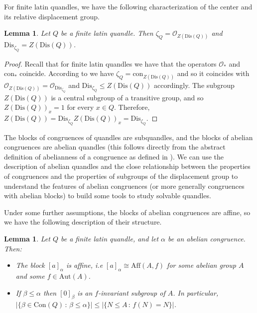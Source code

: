 \documentclass[a4paper, english, 9pt]{amsart}
\theoremstyle{plain}
\newtheorem{lemma}[theorem]{Lemma}
\theoremstyle{definition}
\def\aut#1{\mathrm{Aut}(#1)}
\def\aff#1{\mathrm{Aff}#1}
\def\dis{\mathrm{Dis}}
\def\con{\mathrm{Con}}
\def\c#1{\mathrm{con}_{#1}}
\def\setof#1#2{\{#1\,\colon\,#2\}}
\begin{document}
For finite latin quandles, we have the following characterization of the center and its relative displacement group.
\begin{lemma}\label{center for latin}
    Let $Q$ be a finite latin quandle. Then $\zeta_Q=\mathcal{O}_{Z(\dis(Q))}$ and $\dis_{\zeta_Q}=Z(\dis(Q))$.
\end{lemma}

\begin{proof}
Recall that for finite latin quandles we have that the operators $\mathcal{O}_*$ and $\c{*}$ coincide. According to \cite[Corollary 5.10]{CP} we have $\zeta_Q=\c{Z(\dis(Q))}$ and so it coincides with $\mathcal{O}_{Z(\dis(Q))}=\mathcal{O}_{\dis_{\zeta_Q}}$ and $\dis_{\zeta_Q}\leq Z(\dis(Q))$ accordingly. The subgroup $Z(\dis(Q))$ is a central subgroup of a transitive group, and so $Z(\dis(Q))_x=1$ for every $x\in Q$. Therefore, $Z(\dis(Q))=\dis_{\zeta_Q}Z(\dis(Q))_x=\dis_{\zeta_Q}$.
\end{proof}



The blocks of congruences of quandles are subquandles, and the blocks of abelian congruences are abelian quandles (this follows directly from the abstract definition of abelianness of a congruence as defined in \cite{comm}). We can use the description of abelian quandles and the close relationship between the properties of congruences and the properties of subgroups of the displacement group to understand the features of abelian congruences (or more generally congruences with abelian blocks) to build some tools to study solvable quandles.

Under some further assumptions, the blocks of abelian congruences are affine, so we have the following description of their structure.



\begin{lemma}\label{below abelian}
    Let $Q$ be a finite latin quandle, and let $\alpha$ be an abelian congruence. Then:
    \begin{itemize}
        \item[(i)] The block $[a]_\alpha$ is affine, i.e $[a]_\alpha\cong \aff(A,f)$ for some abelian group $A$ and some $f\in \aut{A}$. 
        \item[ (ii)] If $\beta\leq\alpha$ then $[0]_\beta$ is an $f$-invariant subgroup of $A$. In particular, $|\setof{\beta\in \con(Q)}{\beta\leq \alpha}|\leq |\setof{N\leq A}{f(N)=N}|$.
    \end{itemize}
    

\end{lemma}
\end{document}
